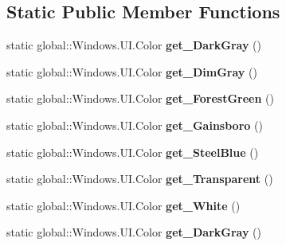 \subsection*{Static Public Member Functions}
\begin{DoxyCompactItemize}
\item 
\mbox{\label{class_windows_1_1_u_i_1_1_colors_a9d76a878f0f92cd5f0179096a3121e38}} 
static global\+::\+Windows.\+U\+I.\+Color {\bfseries get\+\_\+\+Dark\+Gray} ()
\item 
\mbox{\label{class_windows_1_1_u_i_1_1_colors_a8020ea7c708fb217f08da586815839ed}} 
static global\+::\+Windows.\+U\+I.\+Color {\bfseries get\+\_\+\+Dim\+Gray} ()
\item 
\mbox{\label{class_windows_1_1_u_i_1_1_colors_a6d21c1f503e7529cb0ae4b4ee903d4b8}} 
static global\+::\+Windows.\+U\+I.\+Color {\bfseries get\+\_\+\+Forest\+Green} ()
\item 
\mbox{\label{class_windows_1_1_u_i_1_1_colors_a18d119e8aec87552a69de83aa2a72b80}} 
static global\+::\+Windows.\+U\+I.\+Color {\bfseries get\+\_\+\+Gainsboro} ()
\item 
\mbox{\label{class_windows_1_1_u_i_1_1_colors_a28be7a62a560aed8ceb0a3b42b3b354e}} 
static global\+::\+Windows.\+U\+I.\+Color {\bfseries get\+\_\+\+Steel\+Blue} ()
\item 
\mbox{\label{class_windows_1_1_u_i_1_1_colors_a50578f8d8d64342a2a9d3c21acd8f7a0}} 
static global\+::\+Windows.\+U\+I.\+Color {\bfseries get\+\_\+\+Transparent} ()
\item 
\mbox{\label{class_windows_1_1_u_i_1_1_colors_ab982d037d3b9d7bfc8face25899632a5}} 
static global\+::\+Windows.\+U\+I.\+Color {\bfseries get\+\_\+\+White} ()
\item 
\mbox{\label{class_windows_1_1_u_i_1_1_colors_a9d76a878f0f92cd5f0179096a3121e38}} 
static global\+::\+Windows.\+U\+I.\+Color {\bfseries get\+\_\+\+Dark\+Gray} ()
\item 

\end{DoxyCompactItemize}
